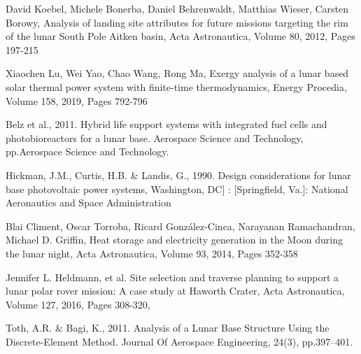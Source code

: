 \documentclass{beamer}
\begin{document}
\begin{thebibliography}{99}



David Koebel, Michele Bonerba, Daniel Behrenwaldt, Matthias Wieser, Carsten Borowy,
Analysis of landing site attributes for future missions targeting the rim of the lunar South Pole Aitken basin,
Acta Astronautica,
Volume 80,
2012,
Pages 197-215

Xiaochen Lu, Wei Yao, Chao Wang, Rong Ma,
Exergy analysis of a lunar based solar thermal power system with finite-time thermodynamics,
Energy Procedia,
Volume 158,
2019,
Pages 792-796


 Belz et al., 2011. Hybrid life support systems with integrated fuel cells and photobioreactors for a lunar base. Aerospace Science and Technology, pp.Aerospace Science and Technology.

Hickman, J.M., Curtis, H.B. \& Landis, G., 1990. Design considerations for lunar base photovoltaic power systems, Washington, DC] : [Springfield, Va.]: National Aeronautics and Space Administration

Blai Climent, Oscar Torroba, Ricard González-Cinca, Narayanan Ramachandran, Michael D. Griffin,
Heat storage and electricity generation in the Moon during the lunar night,
Acta Astronautica,
Volume 93,
2014,
Pages 352-358

Jennifer L. Heldmann, et al. Site selection and traverse planning to support a lunar polar rover mission: A case study at Haworth Crater,
Acta Astronautica, Volume 127, 2016, Pages 308-320,

Toth, A.R. \& Bagi, K., 2011. Analysis of a Lunar Base Structure Using the Discrete-Element Method. Journal Of Aerospace Engineering, 24(3), pp.397–401.

\end{thebibliography}
\end{document}
